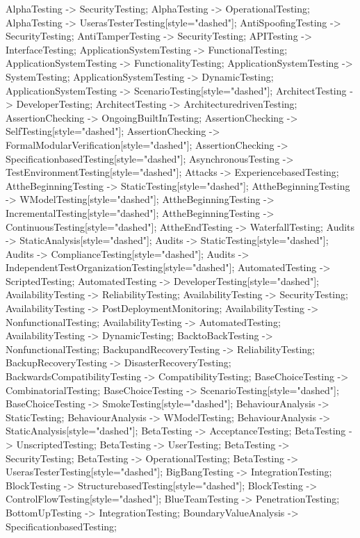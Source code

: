 \documentclass{article}
\begin{document}
{AlphaTesting -> SecurityTesting;
AlphaTesting -> OperationalTesting;
AlphaTesting -> UserasTesterTesting[style="dashed"];
AntiSpoofingTesting -> SecurityTesting;
AntiTamperTesting -> SecurityTesting;
APITesting -> InterfaceTesting;
ApplicationSystemTesting -> FunctionalTesting;
ApplicationSystemTesting -> FunctionalityTesting;
ApplicationSystemTesting -> SystemTesting;
ApplicationSystemTesting -> DynamicTesting;
ApplicationSystemTesting -> ScenarioTesting[style="dashed"];
ArchitectTesting -> DeveloperTesting;
ArchitectTesting -> ArchitecturedrivenTesting;
AssertionChecking -> OngoingBuiltInTesting;
AssertionChecking -> SelfTesting[style="dashed"];
AssertionChecking -> FormalModularVerification[style="dashed"];
AssertionChecking -> SpecificationbasedTesting[style="dashed"];
AsynchronousTesting -> TestEnvironmentTesting[style="dashed"];
Attacks -> ExperiencebasedTesting;
AttheBeginningTesting -> StaticTesting[style="dashed"];
AttheBeginningTesting -> WModelTesting[style="dashed"];
AttheBeginningTesting -> IncrementalTesting[style="dashed"];
AttheBeginningTesting -> ContinuousTesting[style="dashed"];
AttheEndTesting -> WaterfallTesting;
Audits -> StaticAnalysis[style="dashed"];
Audits -> StaticTesting[style="dashed"];
Audits -> ComplianceTesting[style="dashed"];
Audits -> IndependentTestOrganizationTesting[style="dashed"];
AutomatedTesting -> ScriptedTesting;
AutomatedTesting -> DeveloperTesting[style="dashed"];
AvailabilityTesting -> ReliabilityTesting;
AvailabilityTesting -> SecurityTesting;
AvailabilityTesting -> PostDeploymentMonitoring;
AvailabilityTesting -> NonfunctionalTesting;
AvailabilityTesting -> AutomatedTesting;
AvailabilityTesting -> DynamicTesting;
BacktoBackTesting -> NonfunctionalTesting;
BackupandRecoveryTesting -> ReliabilityTesting;
BackupRecoveryTesting -> DisasterRecoveryTesting;
BackwardsCompatibilityTesting -> CompatibilityTesting;
BaseChoiceTesting -> CombinatorialTesting;
BaseChoiceTesting -> ScenarioTesting[style="dashed"];
BaseChoiceTesting -> SmokeTesting[style="dashed"];
BehaviourAnalysis -> StaticTesting;
BehaviourAnalysis -> WModelTesting;
BehaviourAnalysis -> StaticAnalysis[style="dashed"];
BetaTesting -> AcceptanceTesting;
BetaTesting -> UnscriptedTesting;
BetaTesting -> UserTesting;
BetaTesting -> SecurityTesting;
BetaTesting -> OperationalTesting;
BetaTesting -> UserasTesterTesting[style="dashed"];
BigBangTesting -> IntegrationTesting;
BlockTesting -> StructurebasedTesting[style="dashed"];
BlockTesting -> ControlFlowTesting[style="dashed"];
BlueTeamTesting -> PenetrationTesting;
BottomUpTesting -> IntegrationTesting;
BoundaryValueAnalysis -> SpecificationbasedTesting;
}
\end{document}
